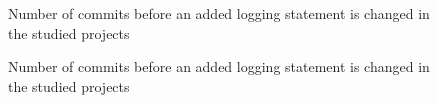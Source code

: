 \begin{figure}[tb]
	
	\centering
	
	
	
	\caption{Number of commits before an added logging statement is changed in the studied projects } 
	\label{fig:NumberofCommits}
\end{figure}
\begin{figure}[tb]
	
	\centering
	
	
	
	\caption{Number of commits before an added logging statement is changed in the studied projects } 
	\label{fig:numberofdays}
\end{figure}

